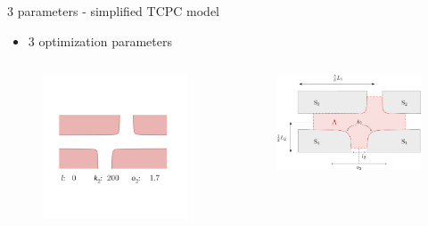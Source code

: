 \documentclass[aspectratio=169,xcolor=dvipsnames]{beamer}
\begin{document}
\begin{frame}{3 parameters - simplified TCPC model}
	\begin{itemize}
		\item 3 optimization parameters
	\end{itemize}
	\begin{columns}
		\begin{column}{.58\textwidth}
			\begin{figure}
				\includegraphics[width=1.\linewidth, trim={5cm 6cm 8cm 19cm}, clip]{Images/b.png}		
			\end{figure}
		\end{column}
		\begin{column}{.42\textwidth}
			\vspace{-15mm}
			\begin{figure}
				\includegraphics[width=1.\linewidth, trim={0 0 0 0}, clip]{Images/krizovatka.pdf}		

\end{figure}
\end{column}
\end{columns}
\end{frame}
\end{document}
